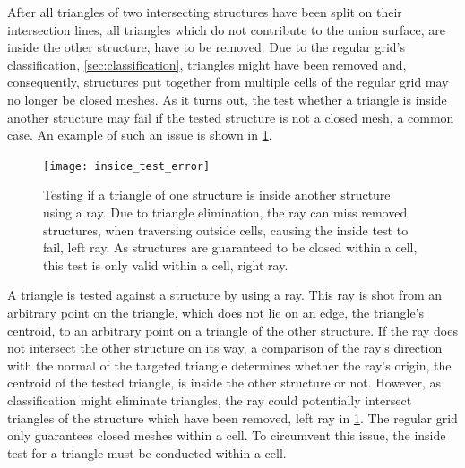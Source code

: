 After all triangles of two intersecting structures have been split on their intersection lines, all triangles which do not contribute to the union surface, \ie are inside the other structure, have to be removed.
Due to the regular grid's classification, \cf \cref{sec:classification}, triangles might have been removed and, consequently, structures put together from multiple cells of the regular grid may no longer be closed meshes.
As it turns out, the test whether a triangle is inside another structure may fail if the tested structure is not a closed mesh, a common case.
An example of such an issue is shown in \cref{fig:inside_test_error}.
%
\begin{figure}[!]
	\centering
	\texttt{[image: inside\_test\_error]}
	\caption[Triangle inside structure test]{
		Testing if a triangle of one structure is inside another structure using a ray.
		Due to triangle elimination, the ray can miss removed structures, \eg when traversing outside cells, causing the inside test to fail, \cf left ray.
		As structures are guaranteed to be closed within a cell, this test is only valid within a cell, \cf right ray.
	}
	\label{fig:inside_test_error}
\end{figure}
%
A triangle is tested against a structure by using a ray.
This ray is shot from an arbitrary point on the triangle, which does not lie on an edge, \eg the triangle's centroid, to an arbitrary point on a triangle of the other structure.
If the ray does not intersect the other structure on its way, a comparison of the ray's direction with the normal of the targeted triangle determines whether the ray's origin, \ie the centroid of the tested triangle, is inside the other structure or not.
However, as classification might eliminate triangles, the ray could potentially intersect triangles of the structure which have been removed, \cf left ray in \cref{fig:inside_test_error}.
The regular grid only guarantees closed meshes within a cell.
To circumvent this issue, the inside test for a triangle must be conducted within a cell.


